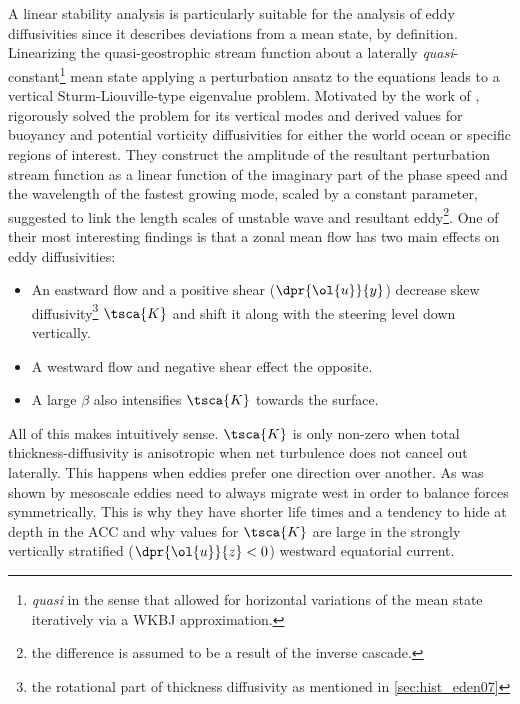 \section*{\citealt{Eden2011a,eden2012implementing,Vollmer2013a}}\label{sec:hist_eden-linstab}
A linear stability analysis is particularly suitable for the analysis of eddy
diffusivities since it describes deviations from a mean state, by definition.
Linearizing the quasi-geostrophic stream function about a laterally
\textit{quasi}-constant\footnote{\textit{quasi} in the sense that \eg
\citeauthor*{Vollmer2013a} allowed for horizontal variations of the mean state
iteratively via a WKBJ approximation.} mean state \ie applying a perturbation
ansatz to the equations leads to a vertical Sturm-Liouville-type eigenvalue
problem. Motivated by the work of \cite{Smith2007},
\citeauthor{Eden2011a,eden2012implementing,Vollmer2013a} rigorously solved the
problem for its vertical modes and derived values for buoyancy and potential
vorticity diffusivities for either the world ocean or specific regions of
interest.  They construct the amplitude of the resultant perturbation stream
function as a linear function of the imaginary part of the phase speed and the
wavelength of the fastest growing mode, scaled by a
constant parameter, suggested to link the length scales of unstable wave and resultant eddy\footnote{the difference is assumed to be a result of the inverse cascade.}. One of their most interesting findings is that a zonal mean flow has two main effects on eddy diffusivities:
\begin{itemize}
	\item
	An eastward flow and a positive shear ($\dpr{\ol{u}}{y}$) decrease skew diffusivity\footnote{\ie the rotational part of thickness diffusivity as mentioned in \ref{sec:hist_eden07}} $\tsca{K}$  and shift it along with the steering level down vertically.
	\item
	A westward flow and negative shear effect the opposite.
	\item
	A large $\beta$ also intensifies $\tsca{K}$ towards the surface.
\end{itemize}
All of this makes intuitively sense. $\tsca{K}$ is only non-zero when total
thickness-diffusivity is anisotropic \ie when net turbulence does not cancel out
laterally. This happens when eddies prefer one direction over another. As was
shown by \cite{Cushman-Roisin1990} mesoscale eddies need to always migrate west
in order to balance forces symmetrically. This is why they have shorter life
times and a tendency to hide at depth in the ACC and why values for $\tsca{K}$
are large in the strongly vertically stratified ($\dpr{\ol{u}}{z}<0$) westward
equatorial current.
